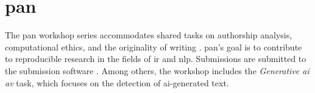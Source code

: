 \section{\acs{pan}}
\label{sec:pan}

The \ac{pan} workshop series accommodates shared tasks %
on authorship analysis, computational ethics, and the originality of writing \cite{ayele_overview_2024}.
\ac{pan}'s goal is to contribute to reproducible research in the fields of \ac{ir} and \ac{nlp}.
Submissions are submitted to the submission software \tira{}.
Among others, the workshop includes the \textit{Generative \ac{ai} \ac{av}} task, 
which focuses on the detection of \ac{ai}-generated text.

